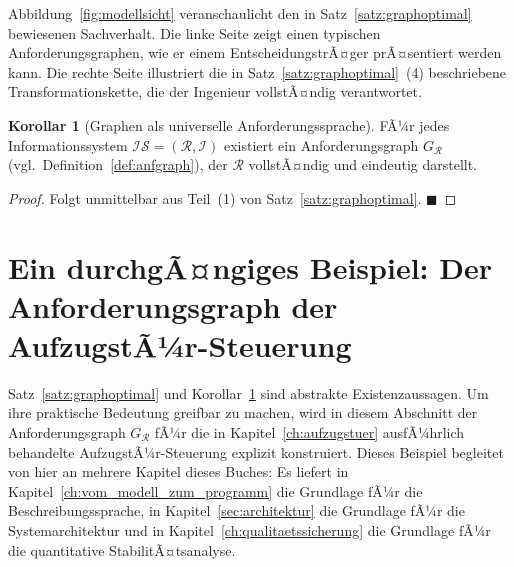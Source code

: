 ﻿\documentclass[a4paper,12pt]{report}
\theoremstyle{definition}
\newtheorem{korollar}{Korollar}[section]
\begin{document}
Abbildung~\ref{fig:modellsicht} veranschaulicht den in Satz~\ref{satz:graphoptimal}
bewiesenen Sachverhalt. Die linke Seite zeigt einen typischen Anforderungsgraphen,
wie er einem EntscheidungstrÃ¤ger prÃ¤sentiert werden kann. Die rechte Seite
illustriert die in Satz~\ref{satz:graphoptimal}~(4) beschriebene Transformationskette,
die der Ingenieur vollstÃ¤ndig verantwortet.

\begin{korollar}[Graphen als universelle Anforderungssprache]
\label{kor:graphuniv}
FÃ¼r jedes Informationssystem $\mathcal{IS} = (\mathcal{R}, \mathcal{I})$ existiert ein
Anforderungsgraph $G_\mathcal{R}$ (vgl.\ Definition~\ref{def:anfgraph}), der
$\mathcal{R}$ vollstÃ¤ndig und eindeutig darstellt.
\end{korollar}

\begin{proof}
Folgt unmittelbar aus Teil~(1) von Satz~\ref{satz:graphoptimal}. $\blacksquare$
\end{proof}


\section{Ein durchgÃ¤ngiges Beispiel: Der Anforderungsgraph der AufzugstÃ¼r-Steuerung}
\label{sec:grobdesign-beispiel}

Satz~\ref{satz:graphoptimal} und Korollar~\ref{kor:graphuniv} sind abstrakte
Existenzaussagen. Um ihre praktische Bedeutung greifbar zu machen, wird in
diesem Abschnitt der Anforderungsgraph $G_{\mathcal{R}}$ fÃ¼r die in
Kapitel~\ref{ch:aufzugstuer} ausfÃ¼hrlich behandelte AufzugstÃ¼r-Steuerung
explizit konstruiert. Dieses Beispiel begleitet von hier an mehrere Kapitel
dieses Buches: Es liefert in Kapitel~\ref{ch:vom_modell_zum_programm} die
Grundlage fÃ¼r die Beschreibungssprache, in
Kapitel~\ref{sec:architektur} die Grundlage fÃ¼r die Systemarchitektur und in
Kapitel~\ref{ch:qualitaetssicherung} die Grundlage fÃ¼r die quantitative
StabilitÃ¤tsanalyse.
\end{document}
